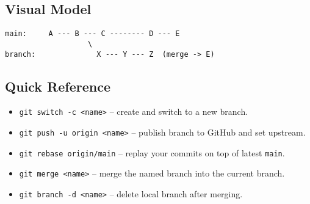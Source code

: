 \documentclass[11pt,letterpaper]{article}
\newcommand{\code}[1]{\textcolor{codeorange}{\texttt{#1}}}
\begin{document}
\subsection{Visual Model}
\begin{lstlisting}
main:     A --- B --- C -------- D --- E
                   \ 
branch:              X --- Y --- Z  (merge -> E)
\end{lstlisting}

\subsection{Quick Reference}
\begin{itemize}
  \item \code{git switch -c <name>} – create and switch to a new branch.
  \item \code{git push -u origin <name>} – publish branch to GitHub and set upstream.
  \item \code{git rebase origin/main} – replay your commits on top of latest \code{main}.
  \item \code{git merge <name>} – merge the named branch into the current branch.
  \item \code{git branch -d <name>} – delete local branch after merging.
\end{itemize}
\end{document}

